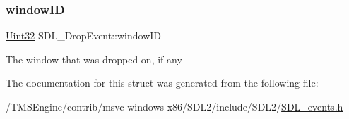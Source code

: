 \subsubsection{\texorpdfstring{window\+ID}{windowID}}
{\footnotesize\ttfamily \hyperlink{_s_d_l__stdinc_8h_add440eff171ea5f55cb00c4a9ab8672d}{Uint32} S\+D\+L\+\_\+\+Drop\+Event\+::window\+ID}

The window that was dropped on, if any 

The documentation for this struct was generated from the following file\+:\begin{DoxyCompactItemize}
\item 
/\+T\+M\+S\+Engine/contrib/msvc-\/windows-\/x86/\+S\+D\+L2/include/\+S\+D\+L2/\hyperlink{_s_d_l__events_8h}{S\+D\+L\+\_\+events.\+h}\end{DoxyCompactItemize}

